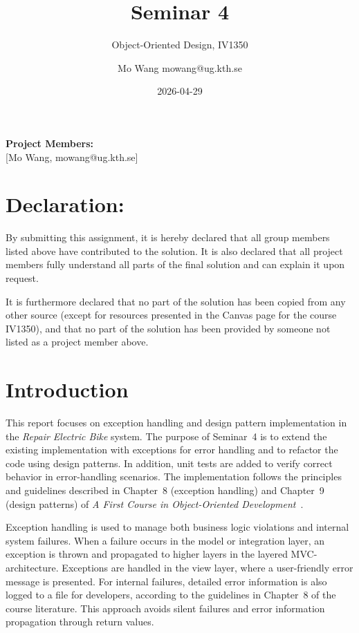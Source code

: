 \documentclass[a4paper]{scrartcl}
\title{Seminar 4}
\subtitle{Object-Oriented Design, IV1350}
\author{Mo Wang mowang@ug.kth.se}
\date{2026-04-29}
\begin{document}
\maketitle
\noindent\textbf{Project Members:} \\ \hfill
[Mo Wang, mowang@ug.kth.se]

\section*{Declaration:}

By submitting this assignment, it is hereby declared that all group members listed above have contributed to the solution. It is also declared that all project members fully understand all parts of the final solution and can explain it upon request.

It is furthermore declared that no part of the solution has been copied from any other source (except for resources presented in the Canvas page for the course IV1350), and that no part of the solution has been provided by someone not listed as a project member above.

\section{Introduction}
\label{sec:intro}

This report focuses on exception handling and design pattern implementation in the \textit{Repair Electric Bike} system. The purpose of Seminar~4 is to extend the existing implementation with exceptions for error handling and to refactor the code using design patterns. In addition, unit tests are added to verify correct behavior in error-handling scenarios. The implementation follows the principles and guidelines described in Chapter~8 (exception handling) and Chapter~9 (design patterns) of \textit{A First Course in Object-Oriented Development}~\cite{coursebook}.

Exception handling is used to manage both business logic violations and internal system failures. When a failure occurs in the model or integration layer, an exception is thrown and propagated to higher layers in the layered MVC-architecture. Exceptions are handled in the view layer, where a user-friendly error message is presented. For internal failures, detailed error information is also logged to a file for developers, according to the guidelines in Chapter~8 of the course literature. This approach avoids silent failures and error information propagation through return values.
\end{document}
